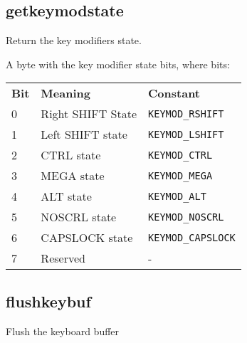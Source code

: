 \subsection{getkeymodstate}
\begin{description}[leftmargin=2cm,style=nextline]
\item [Description:] { 
   Return the key modifiers state.}
\item [Syntax:] 
\item [Return Value:] {A byte with the key modifier state bits, 
    where bits:
   
    \begin{tabular}{lll}
    \textbf{Bit} & \textbf{Meaning} & \textbf{Constant}        \\ 
    0   & Right SHIFT State & \texttt{KEYMOD\_RSHIFT} \\
    1   & Left  SHIFT state & \texttt{KEYMOD\_LSHIFT} \\
    2   & CTRL state        & \texttt{KEYMOD\_CTRL}  \\
    3   & MEGA state        & \texttt{KEYMOD\_MEGA} \\
    4   & ALT state         & \texttt{KEYMOD\_ALT} \\
    5   & NOSCRL state      & \texttt{KEYMOD\_NOSCRL} \\
    6   & CAPSLOCK state    & \texttt{KEYMOD\_CAPSLOCK} \\
    7   & Reserved          & - \\
    \end{tabular}        
    }
\end{description}

\subsection{flushkeybuf}
\begin{description}[leftmargin=2cm,style=nextline]
\item [Description:] {Flush the keyboard buffer}
\item [Syntax:] 
\end{description}

